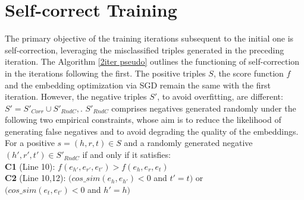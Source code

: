 \documentclass[sigconf]{acmart}
\begin{document}
\section{Self-correct Training}
\label{sect:selfcorrect}
The primary objective of the training iterations subsequent to the initial one is self-correction, leveraging the misclassified triples generated in the preceding iteration. 
The Algorithm \ref{2iter pseudo} outlines the functioning of self-correction in the iterations following the first.
The positive triples $S$, the score function $f$ and the embedding optimization via SGD remain the same with the first iteration. However, the negative triples $S'$, to avoid overfitting, are different:
\(S'= S'_{Corr} \cup S'_{RndC},\). $S'_{RndC}$ comprises negatives generated randomly under the following two empirical constraints, whose aim is to reduce the likelihood of generating false negatives and to avoid degrading the quality of the embeddings. For a   positive $s=(h,r,t)\in S$ and a randomly generated negative $(h',r',t')\in S'_{RndC}$ if and only if it satisfies:\\
\textbf{C1} (Line 10): \(f(e_{h'},e_{r'},e_{t'})>f(e_h,e_r,e_t)\) \\
\textbf{C2}  (Line 10,12): \((cos\_sim(e_h,e_{h'})<0\) and \(t'=t)\) or \\\( (cos\_sim(e_t,e_{t'})<0\) and \(h'=h)\)  



\end{document}
